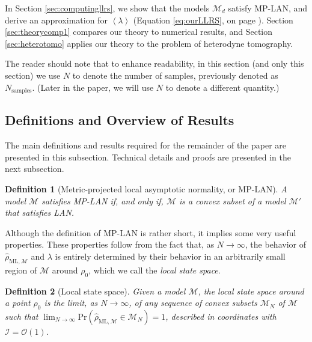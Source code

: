 \documentclass[aps,pra, twocolumn]{revtex4-1}
\newcommand{\M}{\mathcal{M}}
\newcommand{\expect}[1]{\ensuremath{\left\langle#1\right\rangle}}
\newcommand{\rhohat}{\hat{\rho}}
\newcommand{\rhoML}[1]{\rhohat_{\scriptscriptstyle{\mathrm{ML},#1}}}
\newtheorem{mydef}{Definition}
\begin{document}
In Section \ref{sec:computingllrs}, we show that the models $\M_{d}$ satisfy MP-LAN, and derive an approximation for $\expect{\lambda}$  (Equation \eqref{eq:ourLLRS}, on  page \pageref{eq:ourLLRS}).  Section \ref{sec:theorycomp1} compares our theory to numerical results, and Section \ref{sec:heterotomo} applies our theory to the problem of heterodyne tomography.


The reader should note that to enhance readability, in this section (and only this section) we use $N$ to denote the number of samples, previously denoted as $N_{\mathrm{samples}}$. (Later in the paper, we will use $N$ to denote a different quantity.)


\subsection{Definitions and Overview of Results}
\label{sec:lanoverview}
The main definitions and results required for the remainder of the paper are presented in this subsection. Technical details and proofs are presented in the next subsection.

\begin{mydef}[Metric-projected local asymptotic normality, or MP-LAN]
A  model $\M$ satisfies MP-LAN if, and only if, $\M$ is a convex subset of a model $\M'$ that satisfies LAN.
\end{mydef}

Although the definition of MP-LAN is rather short, it implies some very useful properties. These properties follow from the fact that, as $N \rightarrow \infty$, the behavior of $\rhoML{\M}$ and $\lambda$ is entirely determined by their behavior in an arbitrarily small region of $\M$ around $\rho_{0}$, which we call the \emph{local state space}.

\begin{mydef}[Local state space]
Given a model $\M$, the local state space around a point $\rho_{0}$ is the limit, as $N \rightarrow \infty$, of any sequence of convex subsets $\M_{N}$ of $\M$ such that $\lim_{N\rightarrow \infty}\mathrm{Pr}(\rhoML{\M} \in \M_{N}) =1$, described in coordinates with $\mathcal{I} = \mathcal{O}(1)$.
\end{mydef}
\end{document}
